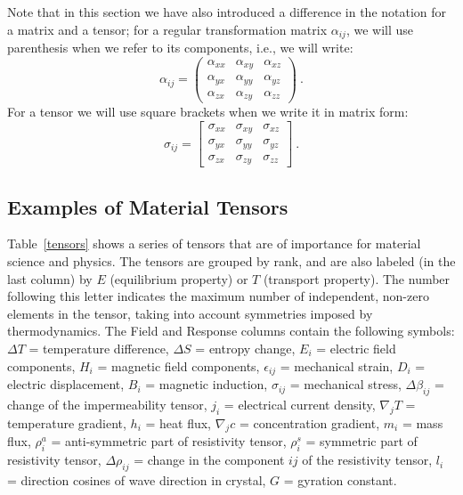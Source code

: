Note that in this section we have also introduced a difference in the notation for a matrix and a tensor; for a regular transformation matrix $\alpha_{ij}$, we will use parenthesis when we refer to its components, i.e., we will write:
\[
	\alpha_{ij} = \left(\begin{array}{ccc}
	\alpha_{xx} & 	\alpha_{xy} & 	\alpha_{xz} \\
	\alpha_{yx} & 	\alpha_{yy} & 	\alpha_{yz} \\
	\alpha_{zx} & 	\alpha_{zy} & 	\alpha_{zz} \end{array}\right)\ .
\]
For a tensor we will use square brackets when we write it in matrix form:
\[
	\sigma_{ij} = \left[\begin{array}{ccc}
	\sigma_{xx} & 	\sigma_{xy} & 	\sigma_{xz} \\
	\sigma_{yx} & 	\sigma_{yy} & 	\sigma_{yz} \\
	\sigma_{zx} & 	\sigma_{zy} & 	\sigma_{zz} \end{array}\right]\ .
\]

\subsection{Examples of Material Tensors}
 
Table~\ref{tensors} shows a series of tensors that are of importance for material science and physics. The tensors are grouped by rank, and are also labeled (in the last column) by $E$ (equilibrium property) or $T$ (transport property).  The number following this letter indicates the maximum number of independent, non-zero elements in the tensor, taking into account symmetries imposed by thermodynamics.  The Field and Response columns contain the following symbols: $\Delta T$ = temperature difference, $\Delta S$ = entropy change, $E_i$ = electric field components, $H_i$ = magnetic field components, $\epsilon_{ij}$ = mechanical strain, $D_i$ = electric displacement, $B_i$ = magnetic induction, $\sigma_{ij}$ = mechanical stress, $\Delta\beta_{ij}$ = change of the impermeability tensor, $j_i$ = electrical current density, $\nabla_j T$ = temperature gradient,  $h_i$ = heat flux,  $\nabla_j c$ = concentration gradient, $m_i$ = mass flux, $\rho^a_i$ = anti-symmetric part of resistivity tensor, $\rho^s_i$ = symmetric part of resistivity tensor, $\Delta \rho_{ij}$ = change in the component $ij$ of the resistivity tensor, $l_i$ = direction cosines of wave direction in crystal, $G$ = gyration constant.

